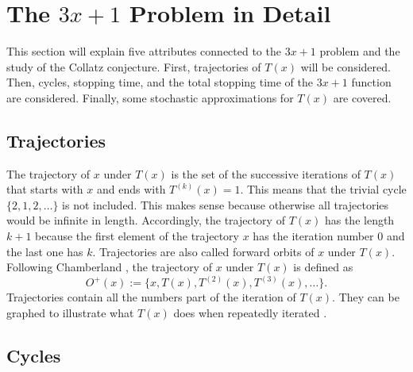 \documentclass[12pt,a4paper,reqno]{amsart}
\begin{document}
\section{The $3x+1$ Problem in Detail}

This section will explain five attributes connected to the $3x+1$ problem
and the study of the Collatz conjecture. First, trajectories of $T(x)$ will be
considered. Then, cycles, stopping time, and the total stopping time of the 
$3x+1$ function are considered. Finally, some stochastic approximations for
$T(x)$ are covered.

\subsection{Trajectories}

The trajectory of $x$ under $T(x)$ is the set of the successive iterations of 
$T(x)$ that starts with $x$ and ends with $T^{(k)}(x)=1$. This means that the
trivial cycle $\{2,1,2,\dots\}$ is not included. This makes sense because
otherwise all trajectories would be infinite in length. Accordingly, the 
trajectory of $T(x)$ has the length $k+1$ because the first element of the 
trajectory $x$ has the iteration number 0 and the last one has $k$. 
Trajectories are also called forward orbits of $x$ under $T(x)$. Following 
Chamberland \cite{src:chamberland}, the trajectory of $x$ under $T(x)$ is 
defined as 
\begin{equation}
    \nonumber
    O^+(x):=\{x, T(x), T^{(2)}(x), T^{(3)}(x),\dots\}.
\end{equation}
Trajectories contain all the numbers part of the iteration of $T(x)$. They can 
be graphed to illustrate what $T(x)$ does when repeatedly iterated 
\cite{src:lagarias}.

\subsection{Cycles}
\end{document}

